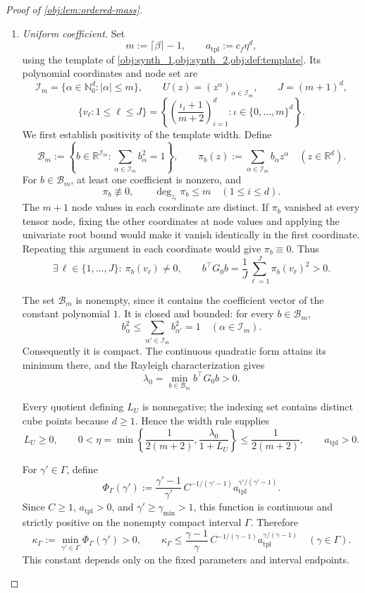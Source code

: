 \documentclass[11pt]{article}
\begin{document}
\begin{proof}[Proof of \cref{obj:lem:ordered-mass}]
\begin{enumerate}
\item \emph{Uniform coefficient.}
Set
\[
m:=\lceil\beta\rceil-1,
\qquad
a_{\mathrm{tpl}}:=c_f\eta^d,
\]
using the template of \cref{obj:synth_1,obj:synth_2,obj:def:template}. Its polynomial coordinates and node set are
\[
\mathcal I_m=\{\alpha\in\mathbb N_0^d:|\alpha|\le m\},
\qquad
U(z)=(z^\alpha)_{\alpha\in\mathcal I_m},
\qquad
J=(m+1)^d,
\]
\[
\{v_\ell:1\le\ell\le J\}
=
\left\{
\left(\frac{\iota_i+1}{m+2}\right)_{i=1}^d:
\iota\in\{0,\ldots,m\}^d
\right\}.
\]
We first establish positivity of the template width. Define
\[
\mathcal B_m:=
\left\{
b\in\mathbb R^{\mathcal I_m}:
\sum_{\alpha\in\mathcal I_m}b_\alpha^2=1
\right\},
\qquad
\pi_b(z):=\sum_{\alpha\in\mathcal I_m}b_\alpha z^\alpha
\quad(z\in\mathbb R^d).
\]
For \(b\in\mathcal B_m\), at least one coefficient is nonzero, and
\[
\pi_b\not\equiv0,
\qquad
\deg_{z_i}\pi_b\le m
\quad(1\le i\le d).
\]
The \(m+1\) node values in each coordinate are distinct. If \(\pi_b\) vanished at every tensor node, fixing the other coordinates at node values and applying the univariate root bound would make it vanish identically in the first coordinate. Repeating this argument in each coordinate would give \(\pi_b\equiv0\). Thus
\[
\exists\,\ell\in\{1,\ldots,J\}:\ \pi_b(v_\ell)\ne0,
\qquad
b^\top G_0b
=
\frac1J\sum_{\ell=1}^J\pi_b(v_\ell)^2>0.
\]

The set \(\mathcal B_m\) is nonempty, since it contains the coefficient vector of the constant polynomial \(1\). It is closed and bounded: for every \(b\in\mathcal B_m\),
\[
b_\alpha^2\le
\sum_{\alpha'\in\mathcal I_m}b_{\alpha'}^2=1
\quad(\alpha\in\mathcal I_m).
\]
Consequently it is compact. The continuous quadratic form attains its minimum there, and the Rayleigh characterization gives
\[
\lambda_0
=
\min_{b\in\mathcal B_m}b^\top G_0b>0.
\]

Every quotient defining \(L_U\) is nonnegative; the indexing set contains distinct cube points because \(d\ge1\). Hence the width rule supplies
\[
L_U\ge0,
\qquad
0<\eta
=
\min\left\{\frac1{2(m+2)},\frac{\lambda_0}{1+L_U}\right\}
\le\frac1{2(m+2)},
\qquad
a_{\mathrm{tpl}}>0.
\]

For \(\gamma'\in\Gamma\), define
\[
\Phi_\Gamma(\gamma')
:=
\frac{\gamma'-1}{\gamma'}\,
C^{-1/(\gamma'-1)}
a_{\mathrm{tpl}}^{\gamma'/(\gamma'-1)}.
\]
Since \(C\ge1\), \(a_{\mathrm{tpl}}>0\), and
\(\gamma'\ge\gamma_{\min}>1\), this function is continuous and strictly positive on the nonempty compact interval \(\Gamma\). Therefore
\[
\kappa_\Gamma:=\min_{\gamma'\in\Gamma}\Phi_\Gamma(\gamma')>0,
\qquad
\kappa_\Gamma\le
\frac{\gamma-1}{\gamma}\,
C^{-1/(\gamma-1)}
a_{\mathrm{tpl}}^{\gamma/(\gamma-1)}
\quad(\gamma\in\Gamma).
\]
This constant depends only on the fixed parameters and interval endpoints.


\end{enumerate}
\end{proof}
\end{document}
